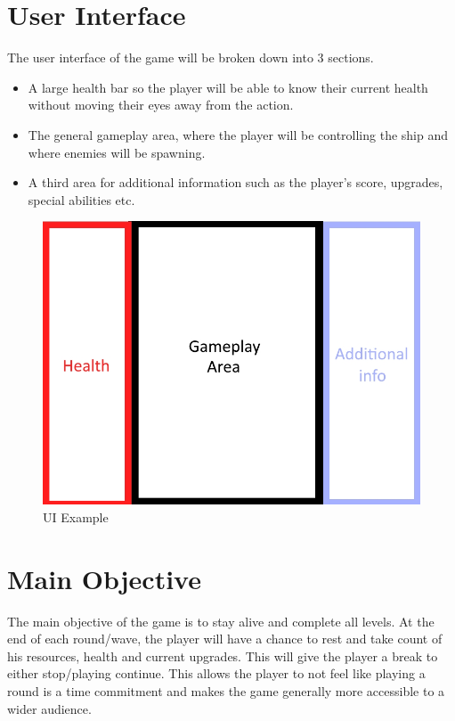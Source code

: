 \documentclass[a4paper]{scrreprt}
\begin{document}
\clearpage

\section{User Interface}
The user interface of the game will be broken down into 3 sections. 
\begin{itemize}
  \item A large health bar so the player will be able to know their current health without moving their eyes away from the action. 
  \item The general gameplay area, where the player will be controlling the ship and where enemies will be spawning. 
  \item A third area for additional information such as the player's score, upgrades, special abilities etc.
\end{itemize}

\begin{figure}[h]
  \centering
  \includegraphics[width=1\textwidth]{UI}
  \caption{\label{fig:art}UI Example}
  \end{figure}

  \clearpage
\section{Main Objective}
The main objective of the game is to stay alive and complete all levels. At the end of each round/wave, the player will have a chance to rest and take count of his resources, health and current upgrades.
This will give the player a break to either stop/playing continue. This allows the player to not feel like playing a round is a time commitment and makes the game generally more accessible to a wider audience.
\end{document}
